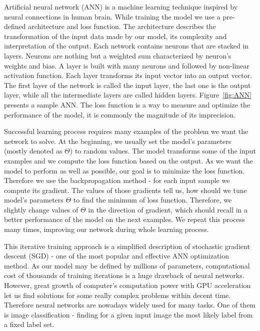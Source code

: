 \documentclass{article}
\begin{document}
Artificial neural network (ANN) is a machine learning technique inspired by neural connections in human brain. While training the model we use a pre-defined architecture and loss function. The architecture describes the transformation of the input data made by our model, its complexity and interpretation of the output. Each network contains neurons that are stacked in layers. Neurons are nothing but a weighted sum characterized by neuron's weights and bias. A layer is built with many neurons and followed by non-linear activation function. Each layer transforms its input vector into an output vector. The first layer of the network is called the input layer, the last one is the output layer, while all the intermediate layers are called hidden layers. Figure~\ref{fig:ANN} presents a sample ANN. The loss function is a way to measure and optimize the performance of the model, it is commonly the magnitude of its imprecision. 
\par
Successful learning process requires many examples of the problem we want the network to solve. At the beginning, we usually set the model's parameters (mostly denoted as $\Theta$) to random values. The model transforms some of the input examples and we compute the loss function based on the output. As we want the model to perform as well as possible, our goal is to minimize the loss function. Therefore we use the backpropagation method - for each input sample we compute its gradient. The values of those gradients tell us, how should we tune model's parameters $\Theta$ to find the minimum of loss function. Therefore, we slightly change values of $\Theta$ in the direction of gradient, which should recall in a better performance of the model on the next examples. We repeat this process many times, improving our network during whole learning process. 
\par
This iterative training approach is a simplified description of stochastic gradient descent (SGD) - one of the most popular and effective ANN optimization method. As our model may be defined by millions of parameters, computational cost of thousands of training iterations is a huge drawback of neural networks. However, great growth of computer's computation power with GPU acceleration let us find solutions for some really complex problems within decent time.  Therefore neural networks are nowadays widely used for many tasks. One of them is image classification - finding for a given input image the most likely label from a fixed label set.
\end{document}
